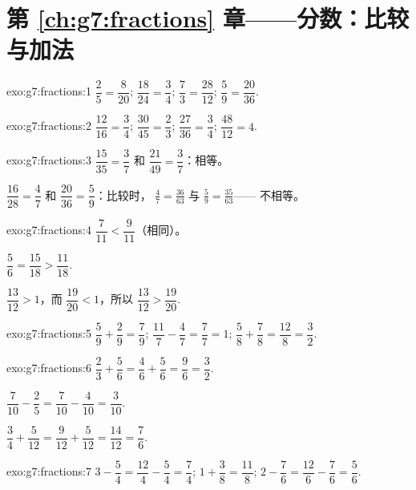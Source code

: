 \section*{第 \ref{ch:g7:fractions} 章——分数：比较与加法}

\begin{solution}{exo:g7:fractions:1}
$\dfrac{2}{5} = \dfrac{8}{20}$; \quad
$\dfrac{18}{24} = \dfrac{3}{4}$; \quad
$\dfrac{7}{3} = \dfrac{28}{12}$; \quad
$\dfrac{5}{9} = \dfrac{20}{36}$.
\end{solution}

\begin{solution}{exo:g7:fractions:2}
$\dfrac{12}{16} = \dfrac34$; \quad
$\dfrac{30}{45} = \dfrac23$; \quad
$\dfrac{27}{36} = \dfrac34$; \quad
$\dfrac{48}{12} = 4$.
\end{solution}

\begin{solution}{exo:g7:fractions:3}
$\dfrac{15}{35} = \dfrac37$ 和 $\dfrac{21}{49} = \dfrac37$：相等。

$\dfrac{16}{28} = \dfrac47$ 和 $\dfrac{20}{36} = \dfrac59$：比较时，
$\frac47 = \frac{36}{63}$ 与 $\frac59 = \frac{35}{63}$——
不相等。
\end{solution}

\begin{solution}{exo:g7:fractions:4}
$\dfrac{7}{11} < \dfrac{9}{11}$（相同）。

$\dfrac56 = \dfrac{15}{18} > \dfrac{11}{18}$.

$\dfrac{13}{12} > 1$，而 $\dfrac{19}{20} < 1$，所以
$\dfrac{13}{12} > \dfrac{19}{20}$.
\end{solution}

\begin{solution}{exo:g7:fractions:5}
$\dfrac59 + \dfrac29 = \dfrac79$; \quad
$\dfrac{11}{7} - \dfrac47 = \dfrac77 = 1$; \quad
$\dfrac58 + \dfrac78 = \dfrac{12}{8} = \dfrac32$.
\end{solution}

\begin{solution}{exo:g7:fractions:6}
$\dfrac23 + \dfrac56 = \dfrac46 + \dfrac56 = \dfrac96 = \dfrac32$.

$\dfrac{7}{10} - \dfrac25 = \dfrac{7}{10} - \dfrac{4}{10} =
\dfrac{3}{10}$.

$\dfrac34 + \dfrac{5}{12} = \dfrac{9}{12} + \dfrac{5}{12} =
\dfrac{14}{12} = \dfrac76$.
\end{solution}

\begin{solution}{exo:g7:fractions:7}
$3 - \dfrac54 = \dfrac{12}{4} - \dfrac54 = \dfrac74$; \quad
$1 + \dfrac38 = \dfrac{11}{8}$; \quad
$2 - \dfrac76 = \dfrac{12}{6} - \dfrac76 = \dfrac56$.
\end{solution}

